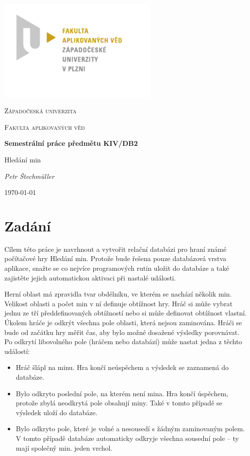 \documentclass{article}
\begin{document}
\begin{titlepage}
		\includegraphics[width=300px]{fav_logo.pdf}\par
		\vspace{1cm}
		\centering
		{\scshape\LARGE Západočeská univerzita \par}
		\vspace{0.5cm}
		{\scshape\Large Fakulta aplikovaných věd \par}
		\vspace{2cm}
		{\Large\bfseries Semestrální práce předmětu KIV/DB2 \par}
		\vspace{0.5cm}
		{\Large Hledání min \par}
		\vspace{0.5cm}
		{\Large\itshape Petr Štechmüller\par}
		\vfill
		{\large \today\par}
\end{titlepage}

\tableofcontents

\section{Zadání}
Cílem této práce je navrhnout a vytvořit relační databázi pro hraní známé počítačové hry Hledání min. 
Protože bude řešena pouze databázová vrstva aplikace, 
snažte se co nejvíce programových rutin uložit do databáze 
a také zajistěte jejich automatickou aktivaci při nastalé události. 

Herní oblast má zpravidla tvar obdélníku, ve kterém se nachází několik min. 
Velikost oblasti a počet min v ní definuje obtížnost hry. 
Hráč si může vybrat jednu ze tří předdefinovaných obtížností nebo si může definovat obtížnost vlastní. 
Úkolem hráče je odkrýt všechna pole oblasti, která nejsou zaminována. 
Hráči se bude od začátku hry měřit čas, aby bylo možné dosažené výsledky porovnávat. 
Po odkrytí libovolného pole (hráčem nebo databází) může
nastat jedna z těchto událostí:
\begin{itemize}
    \item Hráč šlápl na minu. Hra končí neúspěchem a výsledek se zaznamená do databáze.
    \item Bylo odkryto poslední pole, na kterém není mina. Hra končí úspěchem, protože zbylá
neodkrytá pole obsahují miny. Také v tomto případě se výsledek uloží do databáze.
    \item Bylo odkryto pole, které je volné a nesousedí s žádným zaminovaným polem. V tomto
případě databáze automaticky odkryje všechna sousední pole – ty mají společný min.
jeden vrchol.
\end{itemize}
\end{document}
